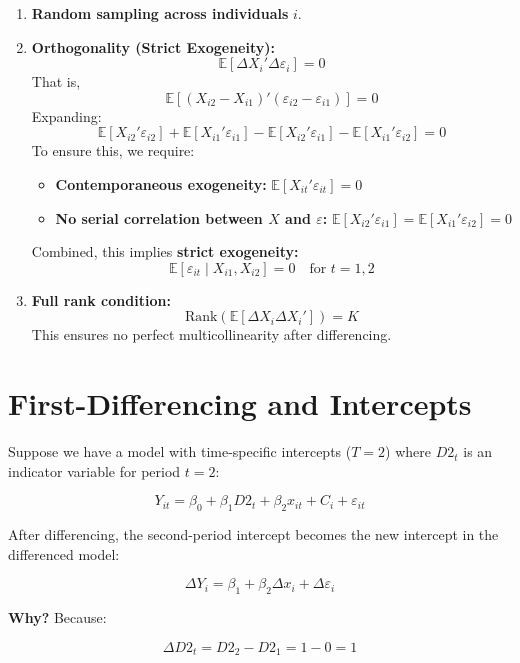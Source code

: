 \documentclass[12pt, oneside]{article}
\begin{document}
\begin{enumerate}
    \item \textbf{Random sampling across individuals} \( i \).

    \item \textbf{Orthogonality (Strict Exogeneity):}
    \[
    \mathbb{E}[\Delta X_i' \Delta \varepsilon_i] = 0
    \]
    That is,
    \[
    \mathbb{E}[(X_{i2} - X_{i1})'(\varepsilon_{i2} - \varepsilon_{i1})] = 0
    \]
    Expanding:
    \[
    \mathbb{E}[X_{i2}' \varepsilon_{i2}] + \mathbb{E}[X_{i1}' \varepsilon_{i1}] - \mathbb{E}[X_{i2}' \varepsilon_{i1}] - \mathbb{E}[X_{i1}' \varepsilon_{i2}] = 0
    \]
    To ensure this, we require:
    \begin{itemize}
        \item \textbf{Contemporaneous exogeneity:} \( \mathbb{E}[X_{it}' \varepsilon_{it}] = 0 \)
        \item \textbf{No serial correlation between \( X \) and \( \varepsilon \):} \( \mathbb{E}[X_{i2}' \varepsilon_{i1}] = \mathbb{E}[X_{i1}' \varepsilon_{i2}] = 0 \)
    \end{itemize}
    Combined, this implies \textbf{strict exogeneity:}
    \[
    \mathbb{E}[\varepsilon_{it} \mid X_{i1}, X_{i2}] = 0 \quad \text{for } t = 1,2
    \]

    \item \textbf{Full rank condition:}
    \[
    \text{Rank}(\mathbb{E}[\Delta X_i \Delta X_i']) = K
    \]
    This ensures no perfect multicollinearity after differencing.
\end{enumerate}

\section*{First-Differencing and Intercepts}

Suppose we have a model with time-specific intercepts (\( T = 2 \)) where \( D2_t \) is an indicator variable for period \( t = 2 \):

\[
Y_{it} = \beta_0 + \beta_1 D2_t + \beta_2 x_{it} + C_i + \varepsilon_{it}
\]

After differencing, the second-period intercept becomes the new intercept in the differenced model:

\[
\Delta Y_i = \beta_1 + \beta_2 \Delta x_i + \Delta \varepsilon_i
\]

\noindent\textbf{Why?} Because:

\[
\Delta D2_t = D2_2 - D2_1 = 1 - 0 = 1
\]
\end{document}
